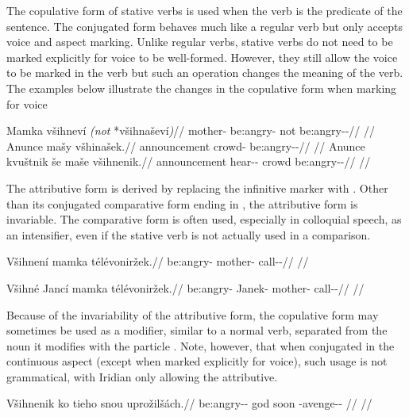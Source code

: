 The copulative form of stative verbs is used when the verb is the predicate of
the sentence. The conjugated form behaves much like a regular verb but only
accepts voice and aspect marking. Unlike regular verbs, stative verbs do not
need to be marked explicitly for voice to be well-formed. However, they still
allow the voice to be marked in the verb but such an operation changes the
meaning of the verb. The examples below illustrate the changes in the copulative
form when marking for voice

\pex
\a\begingl
\gla Mamka všihneví \emph{(not} *všihnaševí\emph{)}//
\glb mother-\Dim{} be:angry-\Cont{} not be:angry-\Av{}-\Cont{}//
\glft {}//
\endgl
\a \begingl
\gla Anunce mašy všhinašek.//
\glb announcement crowd-\Acc{} be:angry-\Av{}-\Pf{}//
\glft {}//
\endgl
\a \begingl
\gla Anunce kvuštnik še maše všihnenik.//
\glb announcement hear-\Pv{}-\Pf{} \Com{} crowd be:angry-\Pv{}-\Pf{}//
\glft {}//
\endgl
\xe

The attributive form is derived by replacing the infinitive marker  with
. Other than its conjugated comparative form ending in , the
attributive form is invariable. The comparative form is often used, especially in colloquial speech,
as an intensifier, even if the stative verb is not actually used in a
comparison.

\ex
\begingl
\gla Všihnení mamka télévoniržek.//
\glb be:angry- mother-\Dim{} call-\Av{}-\Pf{}//
\glft {}//
\endgl
\xe

\ex
\begingl
\gla Všihné Jancí mamka télévoniržek.//
\glb be:angry-\Att{} Janek-\Gen{} mother-\Dim{} call-\Av{}-\Pf{}//
\glft {}//
\endgl
\xe

Because of the invariability of the attributive form, the copulative form may
sometimes be used as a modifier, similar to a normal verb, separated from the
noun it modifies with the particle . Note, however, that when conjugated
in the continuous aspect (except when marked explicitly for voice), such usage
is not grammatical, with Iridian only allowing the attributive.

\ex
\begingl
\gla Všihnenik ko tieho snou uprožilšách.//
\glb be:angry-\Pv{}-\Pf{} \Att{} god soon \Refl{}-avenge-\Av{}-\Ctp{} //
\glft {}//
\endgl
\xe

